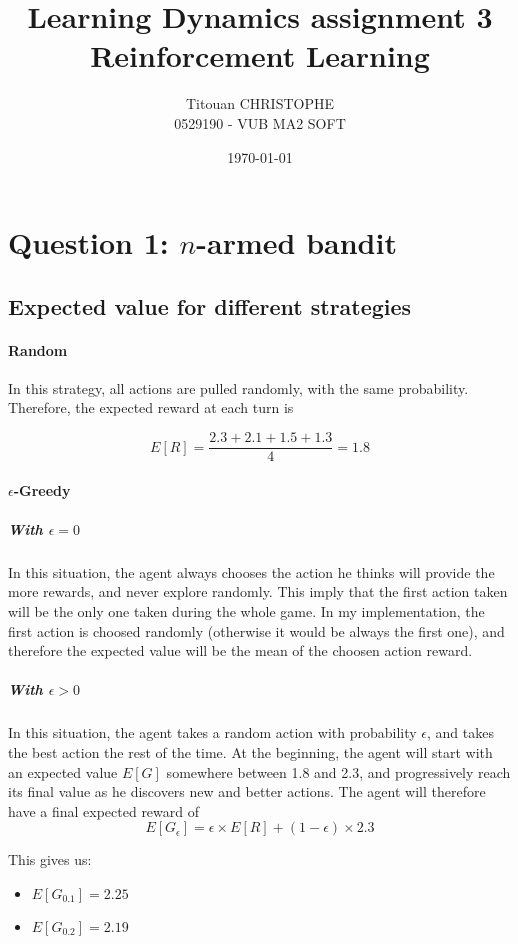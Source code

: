 \documentclass[a4paper,11pt]{article}
\author{Titouan CHRISTOPHE\\\small 0529190 - VUB MA2 SOFT}
\date{\today}
\title{Learning Dynamics assignment 3\\\small Reinforcement Learning}
\begin{document}
\maketitle

\section{Question 1: $n$-armed bandit}
\subsection{Expected value for different strategies}

\paragraph{Random}
In this strategy, all actions are pulled randomly, with the same probability. Therefore, the expected reward at each turn is

\begin{equation}
E[R] = \frac{2.3 + 2.1 + 1.5 + 1.3}{4} = 1.8
\label{eq:random}
\end{equation}


\paragraph{$\epsilon$-Greedy}
\subparagraph{With $\epsilon = 0$}
In this situation, the agent always chooses the action he thinks will provide the more rewards, and never explore randomly. This imply that the first action taken will be the only one taken during the whole game. In my implementation, the first action is choosed randomly (otherwise it would be always the first one), and therefore the expected value will be the mean of the choosen action reward.

\subparagraph{With $\epsilon > 0$}
In this situation, the agent takes a random action with probability $\epsilon$, and takes the best action the rest of the time. At the beginning, the agent will start with an expected value $E[G]$ somewhere between 1.8 and 2.3, and progressively reach its final value as he discovers new and better actions. The agent will therefore have a final expected reward of
\begin{equation}
E[G_{\epsilon}] = \epsilon \times E[R] + (1-\epsilon) \times 2.3
\label{eq:greedy}
\end{equation}

This gives us:
\begin{itemize}
  \item{$E[G_{0.1}] = 2.25$}
  \item{$E[G_{0.2}] = 2.19$}
\end{itemize}
\end{document}
